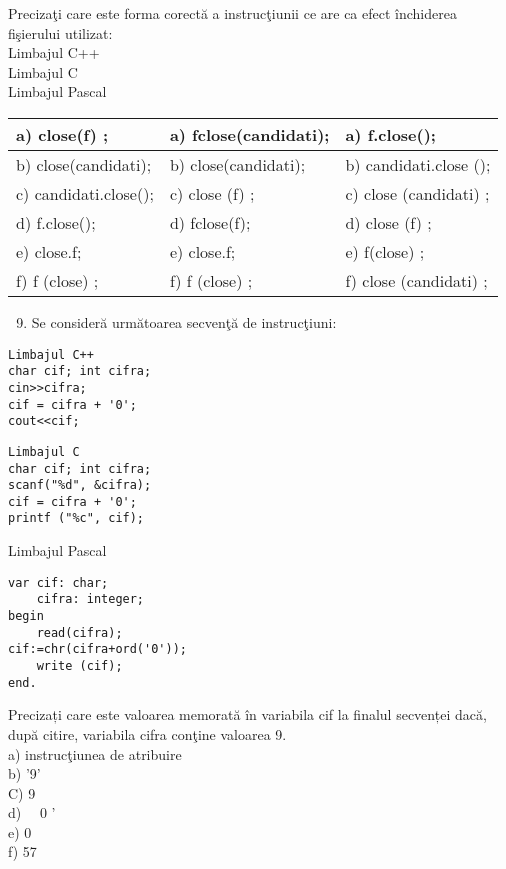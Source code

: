 Precizaţi care este forma corectă a instrucţiunii ce are ca efect închiderea fişierului utilizat:\\
Limbajul C++\\
Limbajul C\\
Limbajul Pascal

\begin{center}
\begin{tabular}{|l|l|l|}
\hline
a) close(f) ; & a) fclose(candidati); & a) f.close(); \\
\hline
b) close(candidati); & b) close(candidati); & b) candidati.close (); \\
\hline
c) candidati.close(); & c) close (f) ; & c) close (candidati) ; \\
\hline
d) f.close(); & d) fclose(f); & d) close (f) ; \\
\hline
e) close.f; & e) close.f; & e) f(close) ; \\
\hline
f) f (close) ; & f) f (close) ; & f) close (candidati) ; \\
\hline
\end{tabular}
\end{center}

\begin{enumerate}
  \setcounter{enumi}{8}
  \item Se consideră următoarea secvenţă de instrucţiuni:
\end{enumerate}

\begin{verbatim}
Limbajul C++
char cif; int cifra;
cin>>cifra;
cif = cifra + '0';
cout<<cif;
\end{verbatim}

\begin{verbatim}
Limbajul C
char cif; int cifra;
scanf("%d", &cifra);
cif = cifra + '0';
printf ("%c", cif);
\end{verbatim}

Limbajul Pascal

\begin{verbatim}
var cif: char;
    cifra: integer;
begin
    read(cifra);
cif:=chr(cifra+ord('0'));
    write (cif);
end.
\end{verbatim}

Precizați care este valoarea memorată în variabila cif la finalul secvenței dacă, după citire, variabila cifra conţine valoarea 9.\\
a) instrucţiunea de atribuire\\
b) '9'\\
C) 9\\
d) $\quad 0$ '\\
e) 0\\
f) 57

